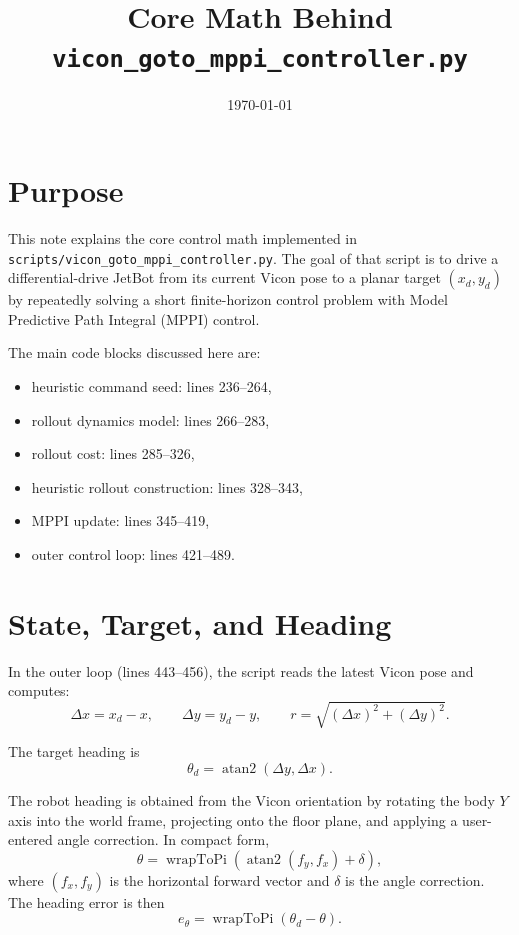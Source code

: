 \documentclass[11pt]{article}
\title{Core Math Behind \texttt{vicon\_goto\_mppi\_controller.py}}
\author{}
\date{\today}
\begin{document}
\maketitle

\section{Purpose}

This note explains the core control math implemented in
\texttt{scripts/vicon\_goto\_mppi\_controller.py}. The goal of that script is
to drive a differential-drive JetBot from its current Vicon pose to a planar
target $(x_d, y_d)$ by repeatedly solving a short finite-horizon control
problem with Model Predictive Path Integral (MPPI) control.

The main code blocks discussed here are:
\begin{itemize}
\item heuristic command seed: lines 236--264,
\item rollout dynamics model: lines 266--283,
\item rollout cost: lines 285--326,
\item heuristic rollout construction: lines 328--343,
\item MPPI update: lines 345--419,
\item outer control loop: lines 421--489.
\end{itemize}

\section{State, Target, and Heading}

In the outer loop (lines 443--456), the script reads the latest Vicon pose and
computes:
\[
\Delta x = x_d - x,
\qquad
\Delta y = y_d - y,
\qquad
r = \sqrt{(\Delta x)^2 + (\Delta y)^2}.
\]

The target heading is
\[
\theta_d = \operatorname{atan2}(\Delta y, \Delta x).
\]

The robot heading is obtained from the Vicon orientation by rotating the body
$Y$ axis into the world frame, projecting onto the floor plane, and applying a
user-entered angle correction. In compact form,
\[
\theta = \operatorname{wrapToPi}\!\left(\operatorname{atan2}(f_y, f_x) + \delta\right),
\]
where $(f_x,f_y)$ is the horizontal forward vector and $\delta$ is the angle
correction. The heading error is then
\[
e_\theta = \operatorname{wrapToPi}(\theta_d - \theta).
\]
\end{document}
